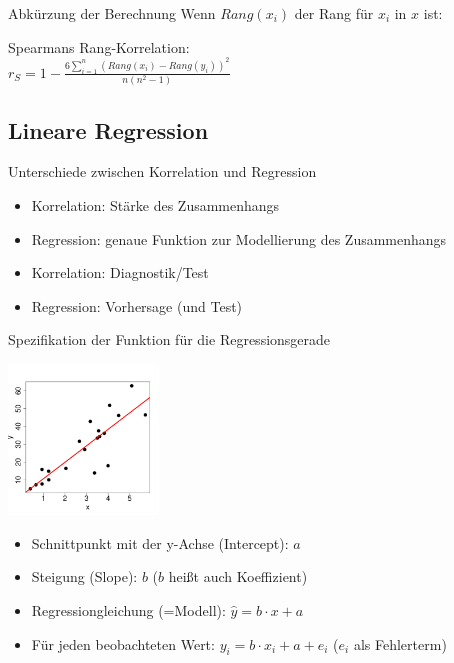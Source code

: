 \begin{frame}
  {Abkürzung der Berechnung}
  Wenn $Rang(x_i)$ der Rang für $x_i$ in $x$ ist:\\
  \vspace{0.5cm}
  \begin{center}
    Spearmans Rang-Korrelation:\\[2ex]
    \alert{$r_{S}=1-\frac{6\sum\limits_{i=1}^n(Rang(x_i)-Rang(y_i))^2}{n(n^2-1)}$}
  \end{center}
\end{frame}

\subsection{Lineare Regression}

\begin{frame}
  {Unterschiede zwischen Korrelation und Regression}
  \begin{itemize}[<+->]
    \item Korrelation: Stärke des Zusammenhangs
    \item \alert{Regression: genaue Funktion zur Modellierung des Zusammenhangs}
      \vspace{0.5cm}
    \item Korrelation: Diagnostik\slash Test
    \item \alert{Regression: Vorhersage} (und Test)
  \end{itemize}
\end{frame}

\begin{frame}
  {Spezifikation der Funktion für die Regressionsgerade}
  \vspace{-0.5cm}
  \begin{center}
    \includegraphics[width=0.3\textwidth]{graphics/regline}
  \end{center}
  \vspace{-0.5cm}
  \pause
  \begin{itemize}[<+->]
    \item Schnittpunkt mit der y-Achse (\alert{Intercept}): \alert{$a$}
    \item Steigung (\alert{Slope}): \alert{$b$} ($b$ heißt auch \alert{Koeffizient}) 
    \item \alert{Regressiongleichung (=Modell): $\hat{y}=b\cdot x+a$}
    \item Für jeden beobachteten Wert: \alert{$y_i=b\cdot x_i+a+e_i$} ($e_i$ als Fehlerterm)
  \end{itemize}
\end{frame}

